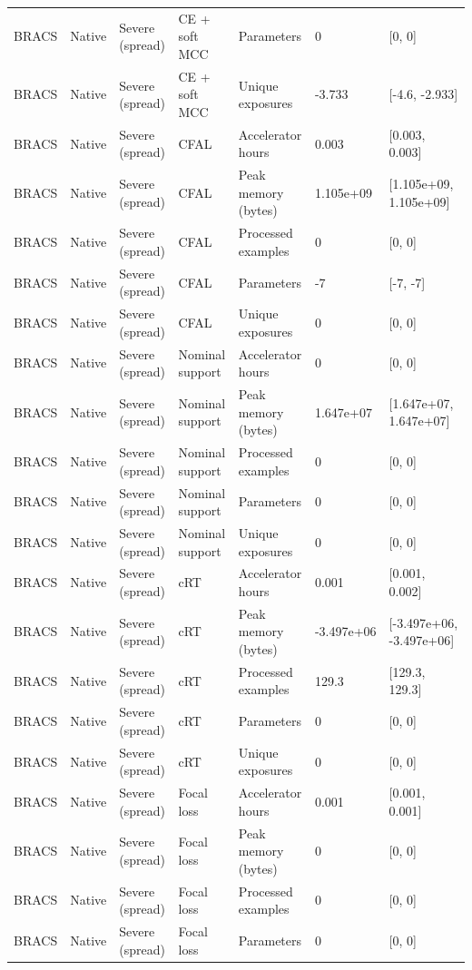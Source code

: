\begin{longtable}{lllllll}
BRACS & Native & Severe (spread) & CE + soft MCC & Parameters & 0 & [0, 0] \\
BRACS & Native & Severe (spread) & CE + soft MCC & Unique exposures & -3.733 & [-4.6, -2.933] \\
BRACS & Native & Severe (spread) & CFAL & Accelerator hours & 0.003 & [0.003, 0.003] \\
BRACS & Native & Severe (spread) & CFAL & Peak memory (bytes) & 1.105e+09 & [1.105e+09, 1.105e+09] \\
BRACS & Native & Severe (spread) & CFAL & Processed examples & 0 & [0, 0] \\
BRACS & Native & Severe (spread) & CFAL & Parameters & -7 & [-7, -7] \\
BRACS & Native & Severe (spread) & CFAL & Unique exposures & 0 & [0, 0] \\
BRACS & Native & Severe (spread) & Nominal support & Accelerator hours & 0 & [0, 0] \\
BRACS & Native & Severe (spread) & Nominal support & Peak memory (bytes) & 1.647e+07 & [1.647e+07, 1.647e+07] \\
BRACS & Native & Severe (spread) & Nominal support & Processed examples & 0 & [0, 0] \\
BRACS & Native & Severe (spread) & Nominal support & Parameters & 0 & [0, 0] \\
BRACS & Native & Severe (spread) & Nominal support & Unique exposures & 0 & [0, 0] \\
BRACS & Native & Severe (spread) & cRT & Accelerator hours & 0.001 & [0.001, 0.002] \\
BRACS & Native & Severe (spread) & cRT & Peak memory (bytes) & -3.497e+06 & [-3.497e+06, -3.497e+06] \\
BRACS & Native & Severe (spread) & cRT & Processed examples & 129.3 & [129.3, 129.3] \\
BRACS & Native & Severe (spread) & cRT & Parameters & 0 & [0, 0] \\
BRACS & Native & Severe (spread) & cRT & Unique exposures & 0 & [0, 0] \\
BRACS & Native & Severe (spread) & Focal loss & Accelerator hours & 0.001 & [0.001, 0.001] \\
BRACS & Native & Severe (spread) & Focal loss & Peak memory (bytes) & 0 & [0, 0] \\
BRACS & Native & Severe (spread) & Focal loss & Processed examples & 0 & [0, 0] \\
BRACS & Native & Severe (spread) & Focal loss & Parameters & 0 & [0, 0] \\

\end{longtable}
